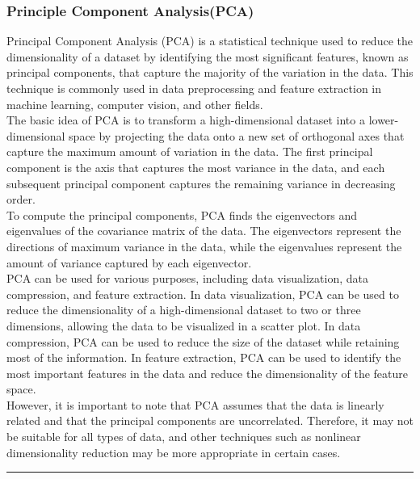 \begin{multicols}{2}
\subsubsection{{{\fontsize{13}{17}\selectfont \textbf{Principle Component Analysis(PCA)}}}}
Principal Component Analysis (PCA) is a statistical technique used to reduce the dimensionality of a dataset by identifying the most significant features, known as principal components, that capture the majority of the variation in the data. This technique is commonly used in data preprocessing and feature extraction in machine learning, computer vision, and other fields.\\
The basic idea of PCA is to transform a high-dimensional dataset into a lower-dimensional space by projecting the data onto a new set of orthogonal axes that capture the maximum amount of variation in the data. The first principal component is the axis that captures the most variance in the data, and each subsequent principal component captures the remaining variance in decreasing order.\\
To compute the principal components, PCA finds the eigenvectors and eigenvalues of the covariance matrix of the data. The eigenvectors represent the directions of maximum variance in the data, while the eigenvalues represent the amount of variance captured by each eigenvector.\\
PCA can be used for various purposes, including data visualization, data compression, and feature extraction. In data visualization, PCA can be used to reduce the dimensionality of a high-dimensional dataset to two or three dimensions, allowing the data to be visualized in a scatter plot. In data compression, PCA can be used to reduce the size of the dataset while retaining most of the information. In feature extraction, PCA can be used to identify the most important features in the data and reduce the dimensionality of the feature space.\\
However, it is important to note that PCA assumes that the data is linearly related and that the principal components are uncorrelated. Therefore, it may not be suitable for all types of data, and other techniques such as nonlinear dimensionality reduction may be more appropriate in certain cases.
\end{multicols}

\vspace{0.5cm}
{\color{gray}\hrule}
\vspace{0.5cm}